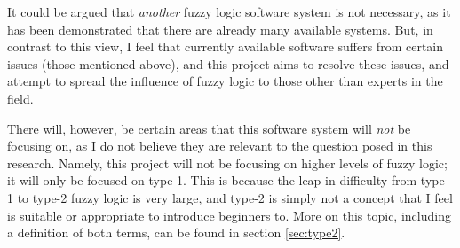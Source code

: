 It could be argued that \textit{another} fuzzy logic software system is not necessary, as it has been demonstrated that there are already many available systems. But, in contrast to this view, I feel that currently available software suffers from certain issues (those mentioned above), and this project aims to resolve these issues, and attempt to spread the influence of fuzzy logic to those other than experts in the field.

There will, however, be certain areas that this software system will \textit{not} be focusing on, as I do not believe they are relevant to the question posed in this research. Namely, this project will not be focusing on higher levels of fuzzy logic; it will only be focused on type-1. This is because the leap in difficulty from type-1 to type-2 fuzzy logic is very large, and type-2 is simply not a concept that I feel is suitable or appropriate to introduce beginners to. More on this topic, including a definition of both terms, can be found in section \ref{sec:type2}.


\newpage 